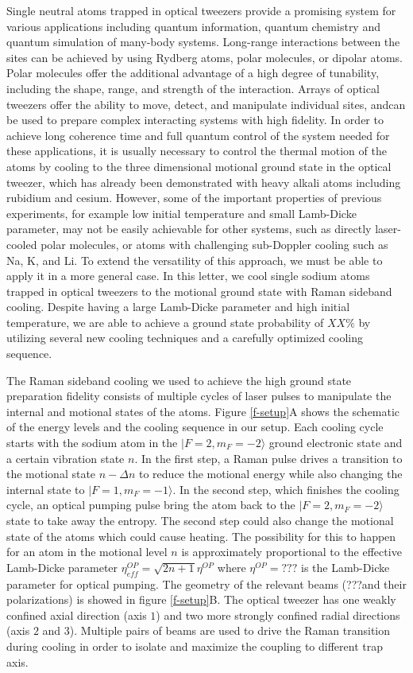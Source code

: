 \documentclass[aps,prl,twocolumn,groupedaddress]{revtex4-1}
\begin{document}
Single neutral atoms trapped in optical tweezers provide a promising system
for various applications including quantum information, quantum chemistry
and quantum simulation of many-body systems.
Long-range interactions between the sites can be achieved by using Rydberg atoms, polar molecules, or dipolar atoms.
Polar molecules offer the additional advantage of a high degree of tunability, including the shape, range, and strength of the interaction.
Arrays of optical tweezers offer the ability to move, detect, and manipulate individual sites, andcan be used to prepare complex interacting systems
with high fidelity.
In order to achieve long coherence time and full quantum control of the system needed for
these applications,
it is usually necessary to control the thermal motion of the atoms by cooling to the
three dimensional motional ground state in the optical tweezer,
which has already been demonstrated with heavy alkali atoms including rubidium and cesium.
However, some of the important properties of previous experiments,
for example low initial temperature and small Lamb-Dicke parameter,
may not be easily achievable for other systems, such as directly laser-cooled polar molecules, or atoms with challenging sub-Doppler cooling such as Na, K, and Li.
To extend the versatility of this approach, we must be able to apply it in a more general case. 
In this letter, we cool single sodium atoms
trapped in optical tweezers to the motional ground state with Raman sideband cooling.
Despite having a large Lamb-Dicke parameter and high initial temperature, we are able to achieve a ground state probability of $XX\%$
by utilizing several new cooling techniques and a carefully optimized cooling sequence.

The Raman sideband cooling we used to achieve the high ground state preparation fidelity
consists of multiple cycles of laser pulses to manipulate the internal and
motional states of the atoms.
Figure \ref{f-setup}A shows the schematic of the energy levels and the cooling sequence
in our setup.
Each cooling cycle starts with the sodium atom in the $|F=2, m_F=-2\rangle$
ground electronic state and a certain vibration state $n$.
In the first step, a Raman pulse drives a transition to the motional state $n-\Delta n$
to reduce the motional energy while also changing the internal state to $|F=1, m_F=-1\rangle$.
In the second step, which finishes the cooling cycle,
an optical pumping pulse bring the atom back to the $|F=2, m_F=-2\rangle$ state to take away
the entropy. The second step could also change the motional state of the atoms which
could cause heating. The possibility for this to happen for an atom in the motional level $n$
is approximately proportional to the effective Lamb-Dicke parameter
$\eta^{OP}_{eff}=\sqrt{2n+1}\eta^{OP}$ where $\eta^{OP}=???$ is the Lamb-Dicke parameter for
optical pumping.
The geometry of the relevant beams (???and their polarizations) is showed in figure \ref{f-setup}B.
The optical tweezer has one weakly confined axial direction (axis $1$) and
two more strongly confined radial directions (axis $2$ and $3$).
Multiple pairs of beams are used to drive the Raman transition during cooling in order to
isolate and maximize the coupling to different trap axis.
\end{document}
